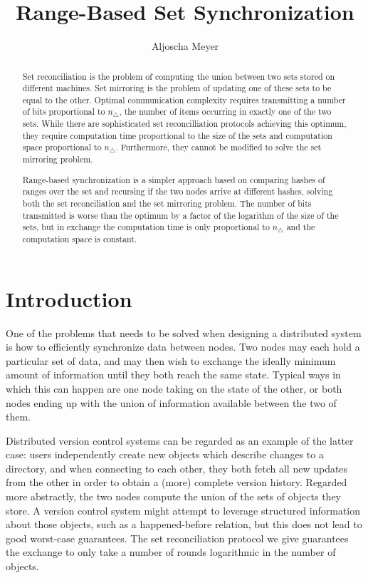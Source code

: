 \documentclass{article}
\title{Range-Based Set Synchronization}
\author{Aljoscha Meyer}
\begin{document}
\maketitle

\begin{abstract}
Set reconciliation is the problem of computing the union between two sets stored on different machines. Set mirroring is the problem of updating one of these sets to be equal to the other. Optimal communication complexity requires transmitting a number of bits proportional to $n_{\triangle}$, the number of items occurring in exactly one of the two sets. While there are sophisticated set reconcilliation protocols achieving this optimum, they require computation time proportional to the size of the sets and computation space proportional to $n_{\triangle}$. Furthermore, they cannot be modified to solve the set mirroring problem.

Range-based synchronization is a simpler approach based on comparing hashes of ranges over the set and recursing if the two nodes arrive at different hashes, solving both the set reconciliation and the set mirroring problem. The number of bits transmitted is worse than the optimum by a factor of the logarithm of the size of the sets, but in exchange the computation time is only proportional to $n_{\triangle}$ and the computation space is constant.
\end{abstract}

\section{Introduction}\label{introduction}

One of the problems that needs to be solved when designing a distributed
system is how to efficiently synchronize data between nodes. Two nodes
may each hold a particular set of data, and may then wish to exchange
the ideally minimum amount of information until they both reach the same
state. Typical ways in which this can happen are one node taking on the
state of the other, or both nodes ending up with the union of
information available between the two of them.

Distributed version control systems can be regarded as an example of the
latter case: users independently create new objects which describe
changes to a directory, and when connecting to each other, they both
fetch all new updates from the other in order to obtain a (more)
complete version history. Regarded more abstractly, the two nodes
compute the union of the sets of objects they store. A version control
system might attempt to leverage structured information about those
objects, such as a happened-before relation, but this does not lead to
good worst-case guarantees. The set reconciliation protocol we give
guarantees the exchange to only take a number of rounds logarithmic in
the number of objects.
\end{document}
